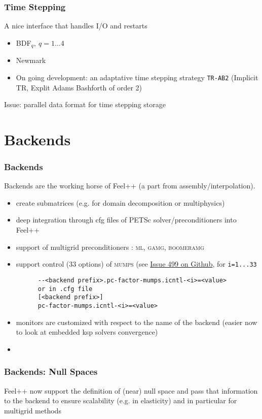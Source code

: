 \begin{frame}
  \frametitle{Time Stepping}

  A nice interface that handles I/O and restarts

  \begin{itemize}
  \item BDF$_q,\ q=1\ldots 4$
  \item Newmark
  \item On going development: an adaptative time stepping strategy
    \texttt{TR-AB2} (Implicit TR, Explit Adams Bashforth of order 2)
  \end{itemize}

  \alert{Issue:} parallel data format for time stepping storage
\end{frame}
\section{Backends}

\begin{frame}[fragile]
  \frametitle{Backends}
  \alert{Backends} are the working horse of Feel++ (a part from
  assembly/interpolation).
  \begin{itemize}
  \item create submatrices (e.g. for domain decomposition or multiphysics)
  \item deep integration through cfg files of PETSc
    solver/preconditioners into Feel++
  \item support of multigrid preconditioners : \textsc{ml},
    \textsc{gamg}, \textsc{boomeramg}
  \item support control (33 options) of \textsc{mumps} (see
    \href{https://github.com/feelpp/feelpp/issues/499}{Issue 499 on Github}, for \verb+i=1...33+
    \begin{verbatim}
      --<backend prefix>.pc-factor-mumps.icntl-<i>=<value>
      or in .cfg file
      [<backend prefix>]
      pc-factor-mumps.icntl-<i>=<value>
    \end{verbatim}
  \item monitors are customized with respect to the name of the
    backend (easier now to look at embedded ksp solvers convergence)
  \item
  \end{itemize}
\end{frame}
\begin{frame}[fragile]
  \frametitle{Backends: Null Spaces}
  Feel++ now support the definition of (near) null space and pass that
  information to the backend to ensure scalability (e.g. in
  elasticity) and in particular for multigrid methods

  \inputminted[fontsize=\scriptsize]{c++}{Codes/prudhomme/fud4/nullspace.cpp}
\end{frame}

